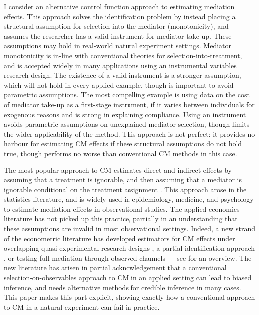 I consider an alternative control function approach to estimating mediation effects.
This approach solves the identification problem by instead placing a structural assumption for selection into the mediator (monotonicity), and assumes the researcher has a valid instrument for mediator take-up.
These assumptions may hold in real-world natural experiment settings.
Mediator monotonicity is in-line with conventional theories for selection-into-treatment, and is accepted widely in many applications using an instrumental variables research design.
The existence of a valid instrument is a stronger assumption, which will not hold in every applied example, though is important to avoid parametric assumptions. %
The most compelling example is using data on the cost of mediator take-up as a first-stage instrument, if it varies between individuals for exogenous reasons and is strong in explaining compliance.
Using an instrument avoids parametric assumptions on unexplained mediator selection, though limits the wider applicability of the method.
This approach is not perfect: it provides no harbour for estimating CM effects if these structural assumptions do not hold true, though performs no worse than conventional CM methods in this case.

The most popular approach to CM estimates direct and indirect effects by assuming that a treatment is ignorable, and then assuming that a mediator is ignorable conditional on the treatment assignment \citep{imai2010identification}.
This approach arose in the statistics literature, and is widely used in epidemiology, medicine, and psychology to estimate mediation effects in observational studies.
The applied economics literature has not picked up this practice, partially in an understanding that these assumptions are invalid in most observational settings.
Indeed, a new strand of the econometric literature has developed estimators for CM effects under overlapping quasi-experimental research designs \citep{frolich2017direct,deuchert2019direct}, a partial identification approach \citep{flores2009identification}, or testing full mediation through observed channels \citep{kwon2024testing} --- see \cite{huber2019review} for an overview.
The new literature has arisen in partial acknowledgement that a conventional selection-on-observables approach to CM in an applied setting can lead to biased inference, and needs alternative methods for credible inference in many cases.
This paper makes this part explicit, showing exactly how a conventional approach to CM in a natural experiment can fail in practice.

